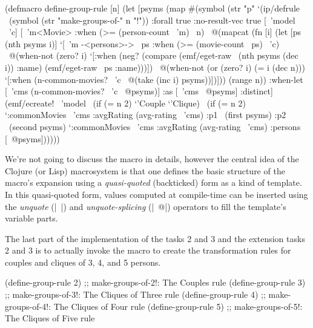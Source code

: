 \documentclass[submission]{eptcs}
\newcommand{\code}{\clojureinline}
\begin{document}
\begin{clojurecode}
(defmacro define-group-rule [n]
  (let [psyms (map #(symbol (str "p" %
    `(ip/defrule ~(symbol (str "make-groups-of-" n "!"))
       {:forall true :no-result-vec true}
       [~'model ~'c]
       [~'m<Movie> :when (>= (person-count ~'m) ~n)
        ~@(mapcat (fn [i]
                    (let [ps (nth psyms i)]
                      `[~'m -<persons>-> ~ps
                        :when (>= (movie-count ~ps) ~'c)
                        ~@(when-not (zero? i)
                            `[:when (neg? (compare (emf/eget-raw ~(nth psyms (dec i)) :name)
                                                   (emf/eget-raw ~ps :name)))])
                        ~@(when-not (or (zero? i) (= i (dec n)))
                            `[:when (n-common-movies? ~'c ~@(take (inc i) psyms))])]))
                  (range n))
        :when-let [~'cms (n-common-movies? ~'c ~@psyms)]
        :as [~'cms ~@psyms]
        :distinct]
       (emf/ecreate! ~'model ~(if (= n 2) `'Couple `'Clique)
                     ~(if (= n 2)
                        `{:commonMovies ~'cms :avgRating (avg-rating ~'cms)
                          :p1 ~(first psyms) :p2 ~(second psyms)}
                        `{:commonMovies ~'cms :avgRating (avg-rating ~'cms)
                          :persons [~@psyms]})))))
\end{clojurecode}

We're not going to discuss the macro in details, however the central idea of
the Clojure (or Lisp) macrosystem is that one defines the basic structure of
the macro's expansion using a \emph{quasi-quoted} (backticked) form as a kind
of template.  In this quasi-quoted form, values computed at compile-time can be
inserted using the \emph{unquote} (\code|~|) and \emph{unquote-splicing}
(\code|~@|) operators to fill the template's variable parts.

The last part of the implementation of the tasks 2 and 3 and the extension
tasks 2 and 3 is to actually invoke the macro to create the transformation
rules for couples and cliques of 3, 4, and 5 persons.

\begin{clojurecode}
(define-group-rule 2) ;; make-groups-of-2!: The Couples rule
(define-group-rule 3) ;; make-groups-of-3!: The Cliques of Three rule
(define-group-rule 4) ;; make-groups-of-4!: The Cliques of Four rule
(define-group-rule 5) ;; make-groups-of-5!: The Cliques of Five rule
\end{clojurecode}
\end{document}

